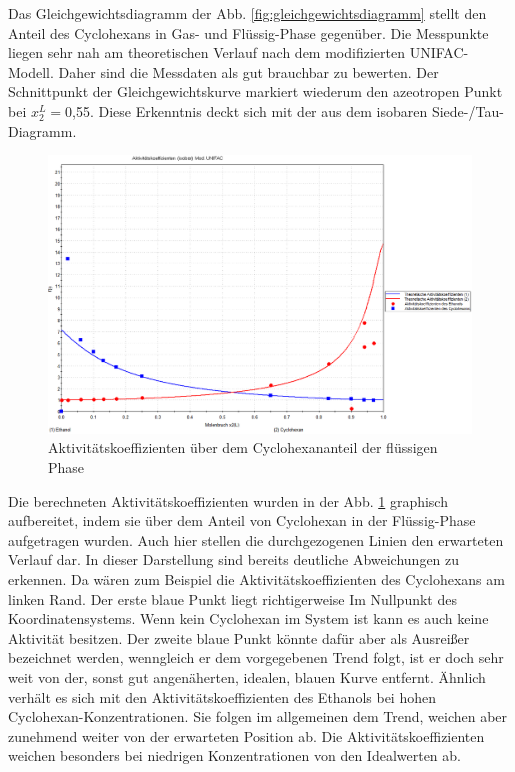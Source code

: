 Das Gleichgewichtsdiagramm der Abb. \ref{fig:gleichgewichtsdiagramm} stellt den Anteil des Cyclohexans in Gas- und Flüssig-Phase gegenüber. Die Messpunkte liegen sehr nah am theoretischen Verlauf nach dem modifizierten UNIFAC-Modell. Daher sind die Messdaten als gut brauchbar zu bewerten. Der Schnittpunkt der Gleichgewichtskurve markiert wiederum den azeotropen Punkt bei $x_2^L=$0,55. Diese Erkenntnis deckt sich mit der aus dem isobaren Siede-/Tau-Diagramm.\\

\begin{figure}[h!]
	\centering
	\includegraphics[width=1.1\linewidth]{img/Aktiv}
	\caption{Aktivitätskoeffizienten über dem Cyclohexananteil der flüssigen Phase}
	\label{fig:Aktiv}
\end{figure}

Die berechneten Aktivitätskoeffizienten wurden in der Abb. \ref{fig:Aktiv} graphisch aufbereitet, indem sie über dem Anteil von Cyclohexan in der Flüssig-Phase aufgetragen wurden. Auch hier stellen die durchgezogenen Linien den erwarteten Verlauf dar. In dieser Darstellung sind bereits deutliche Abweichungen zu erkennen. Da wären zum Beispiel die Aktivitätskoeffizienten des Cyclohexans am linken Rand. Der erste blaue Punkt liegt richtigerweise Im Nullpunkt des Koordinatensystems. Wenn kein Cyclohexan im System ist kann es auch keine Aktivität besitzen. Der zweite blaue Punkt könnte dafür aber als Ausreißer bezeichnet werden, wenngleich er dem vorgegebenen Trend folgt, ist er doch sehr weit von der, sonst gut angenäherten, idealen, blauen Kurve entfernt. Ähnlich verhält es sich mit den Aktivitätskoeffizienten des Ethanols bei hohen Cyclohexan-Konzentrationen. Sie folgen im allgemeinen dem Trend, weichen aber zunehmend weiter von der erwarteten Position ab. Die Aktivitätskoeffizienten weichen besonders bei niedrigen Konzentrationen von den Idealwerten ab.




